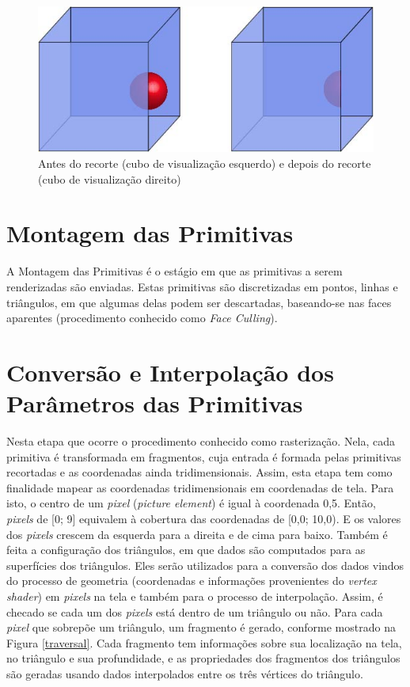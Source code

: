 \begin{anexosenv}
       \begin{figure}[ht]
       \centering
	\includegraphics[keepaspectratio=true,scale=0.5]{figuras/clip.jpg}
       \caption{Antes do recorte (cubo de visualização esquerdo) e depois do recorte (cubo de visualização direito)}
       \label{clip}
       \end{figure}

\section{Montagem das Primitivas}

	A Montagem das Primitivas é o estágio em que as primitivas a serem renderizadas são enviadas. Estas primitivas são discretizadas em pontos, linhas e triângulos, em que algumas delas podem ser descartadas, baseando-se nas faces aparentes (procedimento conhecido como \textit{Face Culling}).  

\section{Conversão e Interpolação dos Parâmetros das Primitivas}

	Nesta etapa que ocorre o procedimento conhecido como rasterização. Nela, cada primitiva é transformada em fragmentos, cuja entrada é formada pelas primitivas recortadas e as coordenadas ainda tridimensionais. Assim, esta etapa tem como finalidade mapear as coordenadas tridimensionais em coordenadas de tela. Para isto, o centro de um \textit{pixel} (\textit{picture element}) é igual à coordenada 0,5. Então, \textit{pixels} de [0; 9] equivalem à cobertura das coordenadas de [0,0; 10,0). E os valores dos \textit{pixels} crescem da esquerda para a direita e de cima para baixo. Também é feita a configuração dos triângulos, em que dados são computados para as superfícies dos triângulos. Eles serão utilizados para a conversão dos dados vindos do processo de geometria (coordenadas e informações provenientes do \textit{vertex shader}) em \textit{pixels} na tela e também para o processo de interpolação. Assim, é checado se cada um dos \textit{pixels} está dentro de um triângulo ou não. Para cada \textit{pixel} que sobrepõe um triângulo, um fragmento é gerado, conforme mostrado na Figura \ref{traversal}. Cada fragmento tem informações sobre sua localização na tela, no triângulo e sua profundidade, e as propriedades dos fragmentos dos triângulos são geradas usando dados interpolados entre os três vértices do triângulo. 


\end{anexosenv}
